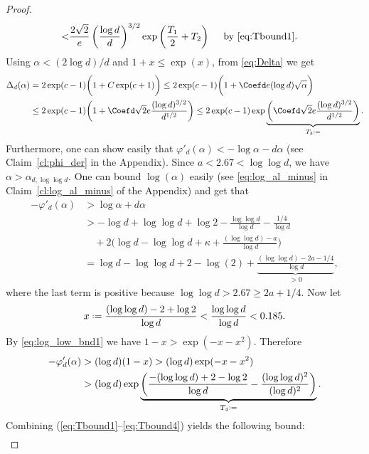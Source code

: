 \documentclass[12pt]{amsart}
\theoremstyle{definition}
\newcommand\al{\alpha}
\newcommand\De{\Delta}
\newcommand\ka{\kappa}
\newcommand{\defeq}{\mathrel{\vcenter{\baselineskip0.5ex \lineskiplimit0pt
                     \hbox{\scriptsize.}\hbox{\scriptsize.}}}%
                     =}
\begin{document}
\begin{proof}
\begin{align}
\begin{split}
<& \frac{2\sqrt{2}}{e} \left( \frac{\log d}{d} \right)^{3/2} 
\exp\left( \frac{T_1}{2}+T_2 \right) \quad 
\text{ by \eqref{eq:Tbound1}.}
\label{eq:Tbound2}
\end{split}
\end{align} 
%
Using $\al < (2 \log d)/d$ and $1+x \leq \exp(x)$, from \eqref{eq:Delta} we get 
%
\begin{align}
\begin{split}\label{eq:Tbound3}
\De_d(\al) &= 2\exp(c-1) \bigg( 1+ C \exp(c+1) \bigg) 
\leq 2\exp(c-1) \bigg( 1+ \Coefd e (\log d) \sqrt{\al} \bigg) \\
&\leq 2\exp(c-1) \bigg( 1+ \Coefd \sqrt{2} e 
\frac{(\log d)^{3/2}}{d^{1/2}} \bigg) 
\leq 2\exp(c-1) \exp \underbrace{\bigg( \Coefd \sqrt{2} e 
\frac{(\log d)^{3/2}}{d^{1/2}} \bigg)}_{T_3 \defeq} .
\end{split}
\end{align}
%
Furthermore, one can show easily that $\varphi'_d(\al) < -\log \al - d\al$ (see Claim~\ref{cl:phi_der} in the Appendix). Since $a<2.67<\log \log d$, we have $\al > \al_{d,\log\log d}$. One can bound $\log(\al)$ easily (see \eqref{eq:log_al_minus} in Claim~\ref{cl:log_al_minus} of the Appendix) and get that   
%
\begin{align*}
-\varphi'_d(\al) &> \log \al + d\al \\
&> -\log d + \log\log d + \log 2 
-\frac{\log\log d}{\log d} -\frac{1/4}{\log d}\\
&\quad + 2\bigg( \log d - \log\log d + \ka 
+ \frac{(\log\log d) - a}{\log d} \bigg) \\
&= \log d - \log\log d + 2 - \log(2)
+ \underbrace{\frac{(\log\log d)-2a-1/4}{\log d}}_{>0} , 
\end{align*}
%
where the last term is positive because $\log\log d > 2.67 \geq 2a+1/4$. Now let 
%
\[ x \defeq \frac{(\log\log d)-2+\log 2}{\log d} 
< \frac{\log\log d}{\log d} < 0.185 .\]
%
By \eqref{eq:log_low_bnd1} we have $1-x > \exp(-x-x^2)$. Therefore 
%
\begin{align}
\begin{split}
\label{eq:Tbound4}
-\varphi'_d(\al) &> (\log d) (1-x) 
> (\log d)\exp(-x-x^2) \\
&> (\log d) \exp \underbrace{\left( 
\frac{-(\log\log d)+2-\log 2}{\log d} 
- \frac{(\log\log d)^2}{(\log d)^2} \right) }_{T_4 \defeq} .
\end{split}
\end{align}
%
Combining (\ref{eq:Tbound1}--\ref{eq:Tbound4}) yields the following bound: 
%
\begin{align*}

\end{align*}
\end{proof}
\end{document}
